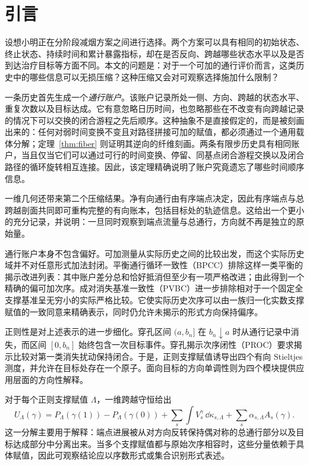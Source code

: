 \section{引言}

设想小明正在分阶段减烟方案之间进行选择。两个方案可以具有相同的初始状态、终止状态、持续时间和累计暴露指标，却在是否反向、跨越哪些状态水平以及是否到达治疗目标等方面不同。本文的问题是：对于一个可加的通行评价而言，这类历史中的哪些信息可以无损压缩？这种压缩又会对可观察选择施加什么限制？

一条历史首先生成一个\emph{通行账户}。该账户记录所处一侧、方向、跨越的状态水平、重复次数以及目标达成。它有意忽略日历时间，也忽略那些在不改变有向跨越记录的情况下可以交换的闭合游程之先后顺序。这种抽象不是直接假定的，而是被刻画出来的：任何对弱时间变换不变且对路径拼接可加的赋值，都必须通过一个通用载体分解；定理~\ref{thm:fiber} 则证明其逆向的纤维刻画。两条有限步历史具有相同账户，当且仅当它们可以通过可行的时间变换、停留、同基点闭合游程交换以及闭合路径的循环旋转相互连接。因此，该定理精确说明了账户究竟遗忘了哪些时间顺序信息。

一维几何还带来第二个压缩结果。净有向通行由有序端点决定，因此有序端点与总跨越剖面共同即可重构完整的有向账本，包括目标处的轨迹信息。这给出一个更小的充分记录，并说明：一旦同时观察到端点流量与总通行，方向就不再是独立的原始量。

通行账户本身不包含偏好。可加测量从实际历史之间的比较出发，而这个实际历史域并不对任意形式加法封闭。平衡通行循环一致性（BPCC）排除这样一类平衡的揭示改进列表：其中账户差分总和恰好抵消但至少有一项严格改进；由此得到一个精确的偏可加次序。成对消失基准一致性（PVBC）进一步排除相对于一个固定全支撑基准呈无穷小的实际严格比较。它使实际历史次序可以由一族归一化实数支撑赋值的一致同意来精确表示，同时仍允许未揭示的形式方向保持偏序。

正则性是对上述表示的进一步细化。穿孔区间 $(a,b_n]$ 在 $b_n\downarrow a$ 时从通行记录中消失，而区间 $[0,b_n]$ 始终包含一次目标事件。穿孔揭示次序闭性（PROC）要求揭示比较对第一类消失扰动保持闭合。于是，正则支撑赋值诱导出四个有向 Stieltjes 测度，并允许在目标处存在一个原子。面向目标的方向单调性则为四个模块提供应用层面的方向性解释。

对于每个正则支撑赋值 $\Lambda$，一维跨越守恒给出
\[
 U_\Lambda(\gamma)
 =P_\Lambda(\gamma(1))-P_\Lambda(\gamma(0))
  +\sum_s\int V_s^\gamma\,\dd\kappa_{s,\Lambda}
  +\sum_s\alpha_{s,\Lambda}A_s(\gamma).
\]
这一分解主要用于解释：端点进展被从对方向反转保持偶对称的总通行部分以及目标达成部分中分离出来。当多个支撑赋值都与原始次序相容时，这些分量依赖于具体赋值，因此可观察结论应以序数形式或集合识别形式表述。

